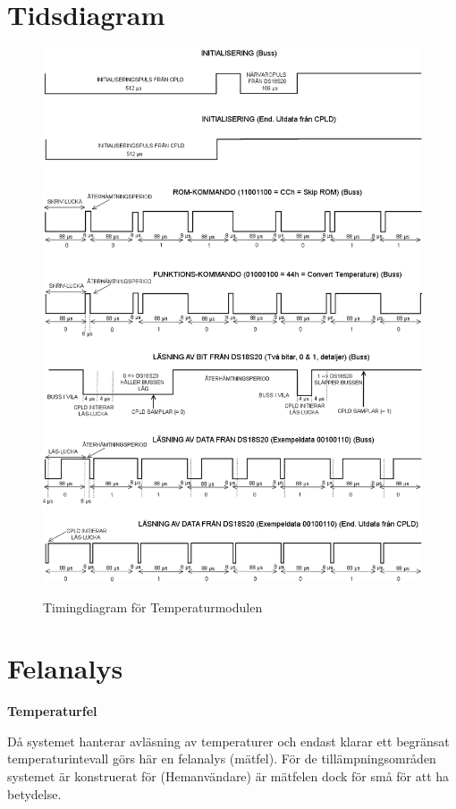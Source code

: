 \documentclass[a4paper,11pt]{article}
\begin{document}
\section{Tidsdiagram}

	\begin{figure}[ht!tb]
	  \centering
	      \includegraphics[scale=0.5, angle=0]{TempTiming.png}
		\label{fig:TempTiming}
	  	\caption{Timingdiagram för Temperaturmodulen}
	\end{figure}

\section{Felanalys}

{\noindent \bf Temperaturfel}

Då systemet hanterar avläsning av temperaturer och endast klarar ett begränsat temperaturintevall
görs här en felanalys (mätfel). För de tillämpningsområden systemet är konstruerat för (Hemanvändare) 
är mätfelen dock för små för att ha betydelse.
\end{document}
